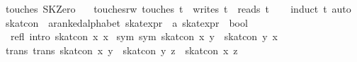 \begin{isabellebody}
{}\ {}touches\ SKZero\ {}\ {}{}{}\isanewline
\isanewline
{}\isamarkupfalse%
\ touches{}rw{}\ {}touches\ t\ {}\ writes\ t\ {}\ reads\ t{}\isanewline
%
\isadelimproof
\ \ %
\endisadelimproof
%
\isatagproof
{}\isamarkupfalse%
\ {}induct\ t{}\ auto{}%
\endisatagproof
{\isafoldproof}%
%
\isadelimproof
%
\endisadelimproof
%
\isamarkuptrue%
\isamarkupfalse%
\ skat{}con\ {}{}\ {}{}a{}{}ranked{}alphabet\ skat{}expr\ {}\ {}a\ skat{}expr\ {}\ bool{}\isanewline
\ \ \isanewline
\ \ \isanewline
\ \ refl\ {}intro{}{}\ {}skat{}con\ x\ x{}\isanewline
{}\ sym\ {}sym{}{}\ {}skat{}con\ x\ y\ {}\ skat{}con\ y\ x{}\isanewline
{}\ trans\ {}trans{}{}\ {}skat{}con\ x\ y\ {}\ skat{}con\ y\ z\ {}\ skat{}con\ x\ z{}\isanewline

\end{isabellebody}
